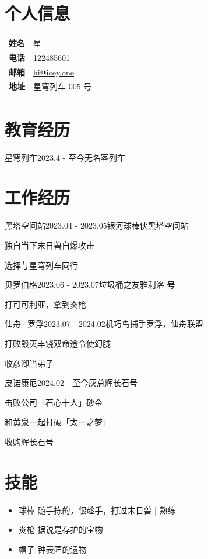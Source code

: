 \documentclass{logo-cv}
\begin{document}
\section{个人信息}
\begin{minipage}{0.75\textwidth}
        \begin{tabular}{ll}
        \textbf{姓名} & 星         \\
        \textbf{电话} & 122485601     \\
        \textbf{邮箱} & \href{mailto:hi@icey.one}{hi@icey.one} \\
        \textbf{地址} & 星穹列车 005 号 
        \end{tabular}
\end{minipage}
\hfill
\section{教育经历}

\begin{cSubsection}{星穹列车}{2023.4 - 至今}{无名客}{列车}
\end{cSubsection}

\section{工作经历}

\begin{rSubsection}
    {黑塔空间站}{2023.04 - 2023.05}{银河球棒侠}{黑塔空间站}
    \item 独自当下末日兽自爆攻击
    \item 选择与星穹列车同行
\end{rSubsection}

\begin{rSubsection}
    {贝罗伯格}{2023.06 - 2023.07}{垃圾桶之友}{雅利洛  号}
    \item 打可可利亚，拿到炎枪
\end{rSubsection}

\begin{rSubsection}
    {仙舟·罗浮}{2023.07 - 2024.02}{机巧鸟捕手}{罗浮，仙舟联盟}
    \item 打败毁灭丰饶双命途令使幻胧
    \item 收彦卿当弟子
\end{rSubsection}

\begin{rSubsection}
    {皮诺康尼}{2024.02 - 至今}{灰总}{辉长石号}
    \item 击败公司「石心十人」砂金
    \item 和黄泉一起打破「太一之梦」
    \item 收购辉长石号
\end{rSubsection}
\section{技能}

\begin{itemize}
    \item 球棒 \hfill 随手拣的，很趁手，打过末日兽 | 熟练
    \item 炎枪 \hfill 据说是存护的宝物
    \item 帽子 \hfill 钟表匠的遗物
\end{itemize}
\end{document}
